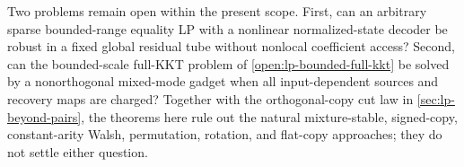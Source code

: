 Two problems remain open within the present scope.  First, can an arbitrary
sparse bounded-range equality LP with a nonlinear normalized-state decoder
be robust in a fixed global residual tube without nonlocal coefficient
access?  Second, can the bounded-scale full-KKT problem of
\cref{open:lp-bounded-full-kkt} be solved by a nonorthogonal
mixed-mode gadget when all input-dependent sources and recovery maps are
charged?  Together with the orthogonal-copy cut law in
\cref{sec:lp-beyond-pairs}, the theorems here rule out the natural
mixture-stable, signed-copy, constant-arity Walsh, permutation, rotation,
and flat-copy approaches; they do not settle either question.
